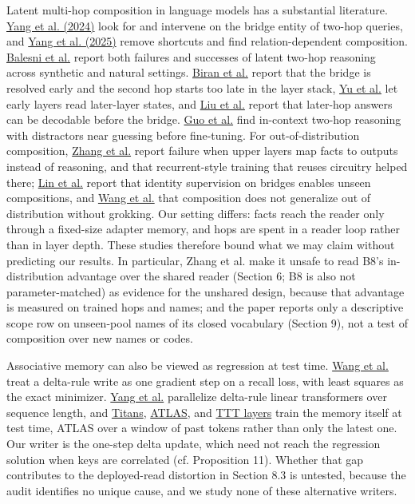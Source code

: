 Latent multi-hop composition in language models has a substantial literature.
\href{https://arxiv.org/abs/2402.16837}{Yang et al. (2024)} look for and intervene on the bridge
entity of two-hop queries, and \href{https://arxiv.org/abs/2411.16679}{Yang et al. (2025)} remove
shortcuts and find relation-dependent composition.
\href{https://arxiv.org/abs/2411.16353}{Balesni et al.} report both failures and successes of
latent two-hop reasoning across synthetic and natural settings.
\href{https://arxiv.org/abs/2406.12775}{Biran et al.} report that the bridge is resolved early and
the second hop starts too late in the layer stack,
\href{https://arxiv.org/abs/2502.10835}{Yu et al.} let early layers read later-layer states, and
\href{https://arxiv.org/abs/2601.03542}{Liu et al.} report that later-hop answers can be decodable
before the bridge. \href{https://arxiv.org/abs/2502.13913}{Guo et al.} find in-context two-hop
reasoning with distractors near guessing before fine-tuning. For out-of-distribution
composition, \href{https://arxiv.org/abs/2608.07261}{Zhang et al.} report failure when upper layers
map facts to outputs instead of reasoning, and that recurrent-style training that reuses
circuitry helped there; \href{https://arxiv.org/abs/2509.24653}{Lin et al.} report that identity
supervision on bridges enables unseen compositions, and
\href{https://arxiv.org/abs/2405.15071}{Wang et al.} that composition does not generalize out of
distribution without grokking. Our setting differs: facts reach the reader only through a
fixed-size adapter memory, and hops are spent in a reader loop rather than in layer depth.
These studies therefore bound what we may claim without predicting our results. In particular,
Zhang et al. make it unsafe to read B8’s in-distribution advantage over the shared reader
(Section 6; B8 is also not parameter-matched) as evidence for the unshared design, because that advantage is measured on trained
hops and names; and the paper reports only a descriptive scope row on unseen-pool names of its
closed vocabulary (Section 9), not a test of composition over new names or codes.

Associative memory can also be viewed as regression at test time.
\href{https://arxiv.org/abs/2501.12352}{Wang et al.} treat a delta-rule write as one gradient step
on a recall loss, with least squares as the exact minimizer.
\href{https://arxiv.org/abs/2406.06484}{Yang et al.} parallelize delta-rule linear transformers over
sequence length, and \href{https://arxiv.org/abs/2501.00663}{Titans},
\href{https://arxiv.org/abs/2505.23735}{ATLAS}, and \href{https://arxiv.org/abs/2407.04620}{TTT layers}
train the memory itself at test time, ATLAS over a window of past tokens rather than only the
latest one. Our writer is the one-step delta update, which need not reach the regression
solution when keys are correlated (cf. Proposition 11). Whether that gap contributes to the
deployed-read distortion in Section 8.3 is untested, because the audit identifies no unique
cause, and we study none of these alternative writers.  %

